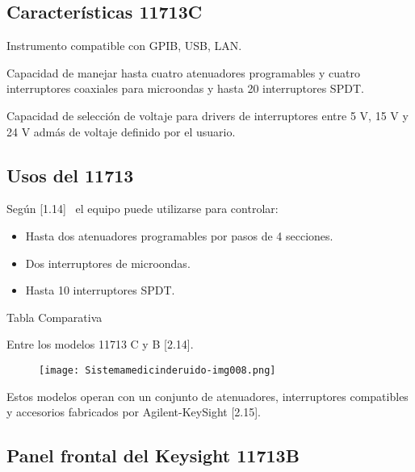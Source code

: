 \documentclass[paper=letter,oneside,fontsize=10pt,parskip=full]{article}
\begin{document}
\subsection[Características 11713C]{Características 11713C}
Instrumento compatible con GPIB, USB, LAN.

Capacidad de manejar hasta cuatro atenuadores programables y cuatro interruptores coaxiales para microondas y hasta 20
interruptores SPDT.

Capacidad de selección de voltaje para drivers de interruptores entre 5 V, 15 V y 24 V admás de voltaje definido por el
usuario. 

\subsection{Usos del 11713}
Según [1.14] \ el equipo puede utilizarse para controlar:

\begin{itemize}
\item Hasta dos atenuadores programables por pasos de 4 secciones.
\item Dos interruptores de microondas.
\item Hasta 10 interruptores SPDT.
\end{itemize}
Tabla Comparativa

Entre los modelos 11713 C y B [2.14].



\begin{figure}
\centering
\texttt{[image: Sistemamedicinderuido-img008.png]}
\end{figure}
Estos modelos operan con un conjunto de atenuadores, interruptores compatibles y accesorios fabricados por
Agilent-KeySight [2.15].

\subsection[Panel frontal del Keysight 11713B]{Panel frontal del Keysight 11713B}
\end{document}
